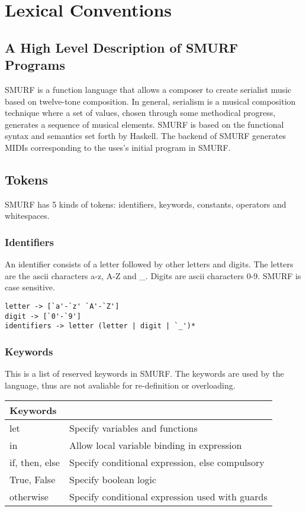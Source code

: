 \section{Lexical Conventions}
\subsection{A High Level Description of SMURF Programs}
SMURF is a function language that allows a composer to create serialist music
based on twelve-tone composition. In general, serialism is a musical composition
technique where a set of values, chosen through some methodical progress,
          generates a sequence of musical elements. SMURF is based on the
          functional syntax and semantics set forth by Haskell. The backend of
          SMURF generates MIDIs corresponding to the uses's initial program in
          SMURF. 

\subsection{Tokens}
SMURF has 5 kinds of tokens: identifiers, keywords, constants, operators and whitespaces.

\subsubsection{Identifiers}
\label{sec:identifiers}
An identifier consists of a letter followed by other letters and
digits. The letters are the ascii characters a-z, A-Z and \_. Digits are ascii
characters 0-9. SMURF is case sensitive.
\begin{verbatim}
letter -> [`a'-`z' `A'-`Z']
digit -> [`0'-`9']
identifiers -> letter (letter | digit | `_')*
\end{verbatim}

\subsubsection{Keywords}
This is a list of reserved keywords in SMURF. The keywords are used by the
language, thus are not avaliable for re-definition or overloading.
\begin{table} [H]
	\centering
    \begin{tabularx}{0.9\textwidth}{l@{\hskip 3cm}l}
    \hline\hline
    Keywords & \\ 
    \hline\hline
      let & Specify variables and functions  \\ \hline
      in & Allow local variable binding in expression \\ \hline
      if, then, else & Specify conditional expression, else compulsory  \\ \hline
      True, False & Specify boolean logic \\ \hline
      otherwise & Specify conditional expression used with guards \\ \hline 
    \end{tabularx}
\end{table}


